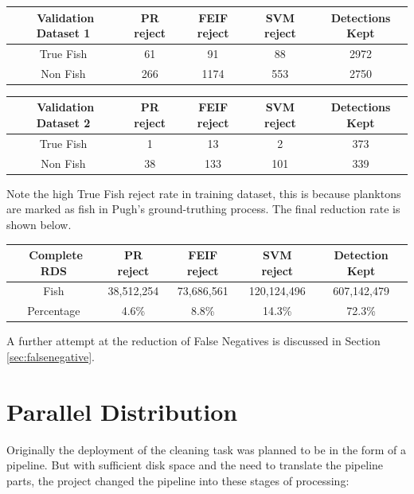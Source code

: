 \documentclass[bsc,frontabs,twoside,fullspacing,parskip,deptreport]{infthesis}
\begin{document}
\begin{center}
\footnotesize
\begin{tabular}{|c|c|c|c|c|}
\hline 
$ $ Validation Dataset 1 & PR reject & FEIF reject & SVM reject & Detections Kept\\
\hline 
True Fish & 61 & 91 & 88 & 2972 \\
Non Fish & 266 & 1174  & 553 & 2750 \\
\hline 
\end{tabular}
\end{center}

\begin{center}
\footnotesize
\begin{tabular}{|c|c|c|c|c|}
\hline 
$ $ Validation Dataset 2 & PR reject & FEIF reject & SVM reject & Detections Kept\\
\hline 
True Fish & 1 & 13  & 2 & 373 \\
Non Fish & 38 & 133 & 101 & 339 \\
\hline 
\end{tabular}
\end{center}

Note the high True Fish reject rate in training dataset, this is because planktons are marked as fish in Pugh's ground-truthing process. The final reduction rate is shown below.

\begin{center}
\footnotesize
\begin{tabular}{|c|c|c|c|c|}
\hline 
$ $ Complete RDS & PR reject & FEIF reject & SVM reject & Detection Kept\\
\hline 
Fish & 38,512,254 & 73,686,561  & 120,124,496 & 607,142,479 \\
Percentage & 4.6\% & 8.8\% & 14.3\% & 72.3\% \\
\hline 
\end{tabular}
\end{center}

A further attempt at the reduction of False Negatives is discussed in Section \ref{sec:falsenegative}.

\chapter{Parallel Distribution}
\label{chap:parallel}

Originally the deployment of the cleaning task was planned to be in the form of a pipeline.
But with sufficient disk space and the need to translate the pipeline parts, the project changed the pipeline into these stages of processing:
\end{document}
